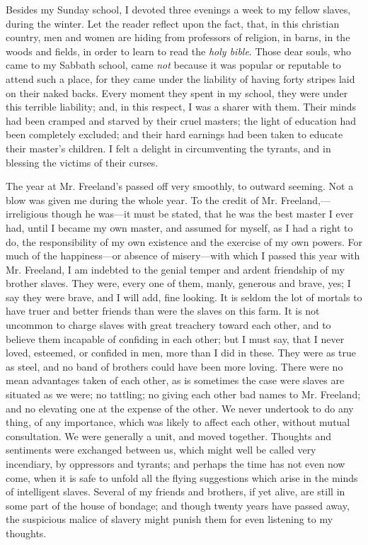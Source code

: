 Besides my Sunday school, I devoted three {}evenings a week to my fellow
slaves, during the winter. Let the reader reflect upon the fact, that,
in this christian country, men and women are hiding from professors of
religion, in barns, in the woods and fields, in order to learn to read
the \emph{holy bible}. Those dear souls, who came to my Sabbath school,
came \emph{not} because it was popular or reputable to attend such a
place, for they came under the liability of having forty stripes laid on
their naked backs. Every moment they spent in my school, they were under
this terrible liability; and, in this respect, I was a sharer with them.
Their minds had been cramped and starved by their cruel masters; the
light of education had been completely excluded; and their hard earnings
had been taken to educate their master's children. I felt a delight in
circumventing the tyrants, and in blessing the victims of their curses.

The year at Mr. Freeland's passed off very smoothly, to outward seeming.
Not a blow was given me during the whole year. To the credit of Mr.
Freeland,---irreligious though he was---it must be stated, that he was
the best master I ever had, until I became my own master, and assumed
for myself, as I had a right to do, the responsibility of my own
existence and the exercise of my own powers. For much of the
happiness---or absence of misery---with which I passed this year with
Mr. Freeland, I am indebted to the genial temper and ardent friendship
of my brother slaves. They were, every one of them, manly, generous and
brave, yes; I say they were brave, and I will add, fine looking. It is
seldom the lot of mortals to have truer and better friends than were the
slaves {}on this farm. It is not uncommon to charge slaves with great
treachery toward each other, and to believe them incapable of confiding
in each other; but I must say, that I never loved, esteemed, or confided
in men, more than I did in these. They were as true as steel, and no
band of brothers could have been more loving. There were no mean
advantages taken of each other, as is sometimes the case were slaves are
situated as we were; no tattling; no giving each other bad names to Mr.
Freeland; and no elevating one at the expense of the other. We never
undertook to do any thing, of any importance, which was likely to affect
each other, without mutual consultation. We were generally a unit, and
moved together. Thoughts and sentiments were exchanged between us, which
might well be called very incendiary, by oppressors and tyrants; and
perhaps the time has not even now come, when it is safe to unfold all
the flying suggestions which arise in the minds of intelligent slaves.
Several of my friends and brothers, if yet alive, are still in some part
of the house of bondage; and though twenty years have passed away, the
suspicious malice of slavery might punish them for even listening to my
thoughts.

